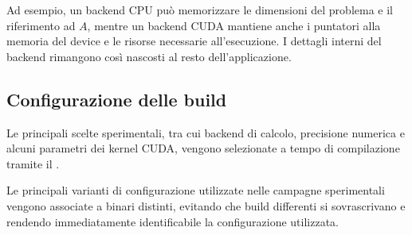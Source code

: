 Ad esempio, un backend CPU può memorizzare le dimensioni del problema
e il riferimento ad $A$, mentre un backend CUDA mantiene anche i
puntatori alla memoria del device e le risorse necessarie
all'esecuzione. I dettagli interni del backend rimangono così
nascosti al resto dell'applicazione.

\subsection{Configurazione delle build}

Le principali scelte sperimentali, tra cui backend di calcolo,
precisione numerica e alcuni parametri dei kernel CUDA, vengono
selezionate a tempo di compilazione tramite il .

Le principali varianti di configurazione utilizzate nelle campagne
sperimentali vengono associate a binari distinti, evitando che build
differenti si sovrascrivano e rendendo immediatamente identificabile
la configurazione utilizzata.